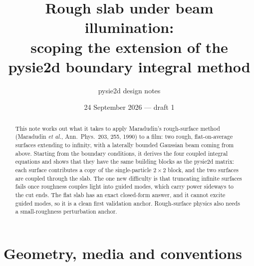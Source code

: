 \documentclass[11pt,a4paper]{article}
\title{Rough slab under beam illumination:\\ scoping the extension of the pysie2d boundary integral method}
\author{pysie2d design notes}
\date{24 September 2026 --- draft 1}
\begin{document}
\maketitle

\begin{abstract}
\noindent
This note works out what it takes to apply Maradudin's rough-surface method
(Maradudin \emph{et al.}, Ann.\ Phys.\ 203, 255, 1990) to a film: two rough,
flat-on-average surfaces extending to infinity, with a laterally bounded
Gaussian beam coming from above. Starting from the boundary conditions, it
derives the four coupled integral equations and shows that they have the same
building blocks as the pysie2d matrix: each surface contributes a copy of the
single-particle $2\times2$ block, and the two surfaces are coupled through the
slab. The one new difficulty is that truncating infinite surfaces fails once
roughness couples light into guided modes, which carry power sideways to the
cut ends. The flat slab has an exact closed-form answer, and it cannot excite
guided modes, so it is a clean first validation anchor. Rough-surface physics
also needs a small-roughness perturbation anchor.
\end{abstract}

\section{Geometry, media and conventions}
\end{document}
